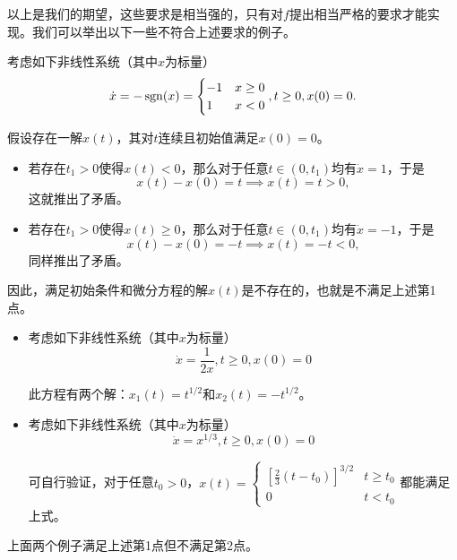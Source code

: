 以上是我们的期望，这些要求是相当强的，只有对$f$提出相当严格的要求才能实现。我们可以举出以下一些不符合上述要求的例子。
\begin{example}[不存在解] 
  考虑如下非线性系统（其中$x$为标量）
  \begin{equation*}
    \dot{x}=-\operatorname{sgn}(x)=\begin{cases}
      -1&x\ge0\\
      1&x<0
    \end{cases},t\ge 0,x(0)=0.
  \end{equation*}

  假设存在一解$x(t)$，其对$t$连续且初始值满足$x(0)=0$。
  \begin{itemize}[leftmargin=1em]
    \item 若存在$t_1>0$使得$x(t)<0$，那么对于任意$t\in(0,t_1)$均有$\dot{x}=1$，于是\[x(t)-x(0)=t\implies x(t)=t>0,\]这就推出了矛盾。
    \item 若存在$t_1>0$使得$x(t)\ge 0$，那么对于任意$t\in(0,t_1)$均有$\dot{x}=-1$，于是\[x(t)-x(0)=-t\implies x(t)=-t<0,\]同样推出了矛盾。
  \end{itemize}

  因此，满足初始条件和微分方程的解$x(t)$是不存在的，也就是不满足上述第1点。
\end{example}
\begin{example}[解存在但不唯一] 
  \begin{itemize}[leftmargin=1em]
    \item 考虑如下非线性系统（其中$x$为标量）
    \begin{equation*}
      \dot{x}=\frac{1}{2x},t\ge 0,x(0)=0
    \end{equation*}
  
    此方程有两个解：$x_1(t)=t^{1/2}$和$x_2(t)=-t^{1/2}$。
    \item 考虑如下非线性系统（其中$x$为标量）
    \begin{equation*}
      \dot{x}=x^{1/3},t\ge 0,x(0)=0
    \end{equation*}
  
    可自行验证，对于任意$t_0>0$，$x(t)=\begin{cases}
      \left[\frac{2}{3}(t-t_0)\right]^{3/2}&t\ge t_0\\0&t<t_0
    \end{cases}$都能满足上式。
  \end{itemize}

  上面两个例子满足上述第1点但不满足第2点。
\end{example}

